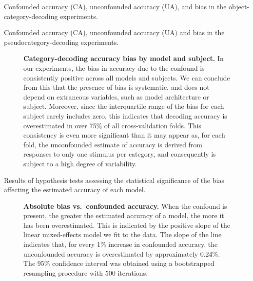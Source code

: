 \documentclass{article}
\begin{document}
\setcounter{table}{1}
\setcounter{figure}{2}
\begin{table}
  \centering
  \caption{Confounded accuracy (CA), unconfounded accuracy (UA), and bias in the object-category-decoding experiments.}
  \label{tab:category-decoding-confounded-hp}
  
\end{table}

\begin{table}
  \centering
  \caption{Confounded accuracy (CA), unconfounded accuracy (UA) and bias in the pseudocategory-decoding experiments.}
  \label{tab:pseudocategory-decoding-results}
  
\end{table}

\begin{figure}
  \centering
    \caption{\textbf{Category-decoding accuracy bias by model and subject.} In our experiments, the bias in accuracy due to the confound is consistently positive across all models and subjects. We can conclude from this that the presence of bias is systematic, and does not depend on extraneous variables, such as model architecture or subject. Moreover, since the interquartile range of the bias for each subject rarely includes zero, this indicates that decoding accuracy is overestimated in over 75\% of all cross-validation folds. This consistency is even more significant than it may appear as, for each fold, the unconfounded estimate of accuracy is derived from responses to only one stimulus per category, and consequently is subject to a high degree of variability.}
  \label{fig:accuracy-bias-results}
\end{figure}

\begin{table}
  \caption{Results of hypothesis tests assessing the statistical significance of the bias affecting the estimated accuracy of each model.}
  \label{tab:bias-hypothesis-tests}
  \centering
  
\end{table}

\begin{figure}
  \centering
  \caption{\textbf{Absolute bias vs.\ confounded accuracy.}
   When the confound is present, the greater the estimated accuracy of a model, the more it has been overestimated. This is indicated by the positive slope of the linear mixed-effects model we fit to the data. The slope of the line indicates that, for every 1\% increase in confounded accuracy, the unconfounded accuracy is overestimated by approximately 0.24\%. The 95\% confidence interval was obtained using a bootstrapped resampling procedure with 500 iterations.}
  \label{fig:bias-vs-confounded-accuracy}
\end{figure}
\end{document}
